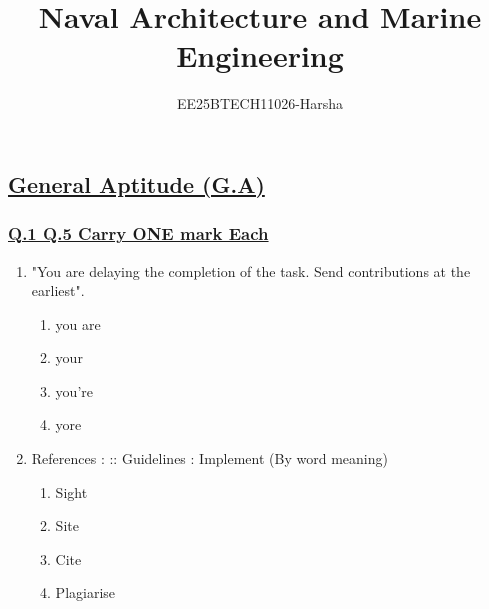 \documentclass[journal]{IEEEtran}
\theoremstyle{remark}
\begin{document}

\onecolumn

\title{Naval Architecture and Marine Engineering}
\author{EE25BTECH11026-Harsha}
\maketitle

\renewcommand{\thefigure}{\theenumi}
\renewcommand{\thetable}{\theenumi}
\setcounter{secnumdepth}{0}
\subsection{\underline{\textbf{General Aptitude (G.A)}}}
\subsubsection{\underline{Q.1 \text{-} Q.5 Carry ONE mark Each}}
\setlength{\parskip}{1em}

\begin{enumerate}[itemsep=1em]
\item "You are delaying the completion of the task. Send \underline{\hspace{2cm}} contributions at the earliest".
\begin{multicols}{4}
\begin{enumerate}
      \item you are
      \item your
      \item you're
      \item yore
\end{enumerate}
\end{multicols}
\end{enumerate}

\begin{enumerate}[itemsep=1em]
\setcounter{enumi}{1}
\item References : \underline{\hspace{1cm}} :: Guidelines : Implement (By word meaning) 

\begin{multicols}{4}
\begin{enumerate}
       \item Sight
       \item Site
       \item Cite
       \item Plagiarise
\end{enumerate}
\end{multicols}
\end{enumerate}
\end{document}
